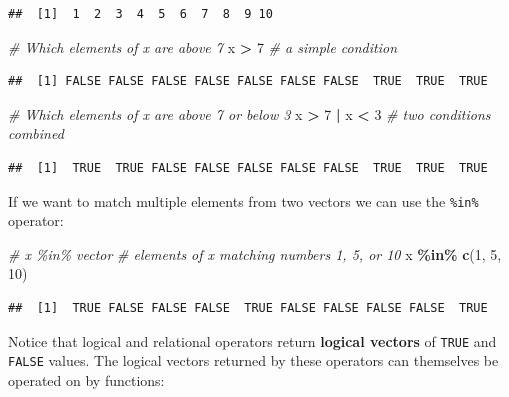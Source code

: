 \documentclass[
]{book}
\newenvironment{Shaded}{\begin{snugshade}}{\end{snugshade}}
\newcommand{\CommentTok}[1]{\textcolor[rgb]{0.56,0.35,0.01}{\textit{#1}}}
\newcommand{\DecValTok}[1]{\textcolor[rgb]{0.00,0.00,0.81}{#1}}
\newcommand{\KeywordTok}[1]{\textcolor[rgb]{0.13,0.29,0.53}{\textbf{#1}}}
\newcommand{\NormalTok}[1]{#1}
\newcommand{\OperatorTok}[1]{\textcolor[rgb]{0.81,0.36,0.00}{\textbf{#1}}}
\newcommand{\StringTok}[1]{\textcolor[rgb]{0.31,0.60,0.02}{#1}}
\begin{document}
\begin{verbatim}
##  [1]  1  2  3  4  5  6  7  8  9 10
\end{verbatim}

\begin{Shaded}
\begin{Highlighting}[]
\CommentTok{\# Which elements of x are above 7}
\NormalTok{x }\OperatorTok{\textgreater{}}\StringTok{ }\DecValTok{7} \CommentTok{\# a simple condition}
\end{Highlighting}
\end{Shaded}

\begin{verbatim}
##  [1] FALSE FALSE FALSE FALSE FALSE FALSE FALSE  TRUE  TRUE  TRUE
\end{verbatim}

\begin{Shaded}
\begin{Highlighting}[]
\CommentTok{\# Which elements of x are above 7 or below 3}
\NormalTok{x }\OperatorTok{\textgreater{}}\StringTok{ }\DecValTok{7} \OperatorTok{|}\StringTok{ }\NormalTok{x }\OperatorTok{\textless{}}\StringTok{ }\DecValTok{3} \CommentTok{\# two conditions combined}
\end{Highlighting}
\end{Shaded}

\begin{verbatim}
##  [1]  TRUE  TRUE FALSE FALSE FALSE FALSE FALSE  TRUE  TRUE  TRUE
\end{verbatim}

If we want to match multiple elements from two vectors we can use the \texttt{\%in\%} operator:

\begin{Shaded}
\begin{Highlighting}[]
\CommentTok{\# x \%in\% vector}
\CommentTok{\# elements of x matching numbers 1, 5, or 10 }
\NormalTok{x }\OperatorTok{\%in\%}\StringTok{ }\KeywordTok{c}\NormalTok{(}\DecValTok{1}\NormalTok{, }\DecValTok{5}\NormalTok{, }\DecValTok{10}\NormalTok{) }
\end{Highlighting}
\end{Shaded}

\begin{verbatim}
##  [1]  TRUE FALSE FALSE FALSE  TRUE FALSE FALSE FALSE FALSE  TRUE
\end{verbatim}

Notice that logical and relational operators return \textbf{logical vectors} of \texttt{TRUE} and \texttt{FALSE} values. The logical vectors returned by these operators can themselves be operated on by functions:
\end{document}
